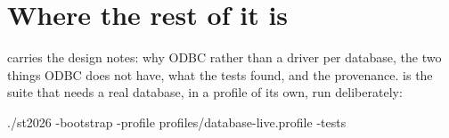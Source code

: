\section{Where the rest of it is}

 carries the design notes: why ODBC rather than a driver
per database, the two things ODBC does not have, what the tests found, and the
provenance.  is the suite that needs a real
database, in a profile of its own, run deliberately:

\begin{sh}
./st2026 -bootstrap -profile profiles/database-live.profile -tests
\end{sh}
